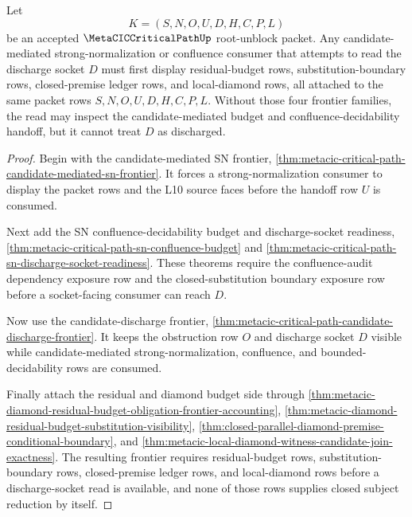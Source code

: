 \begin{theorem}
\label{thm:metacic-critical-path-residual-budget-discharge-frontier}
Let
$$
K=(S,N,O,U,D,H,C,P,L)
$$
be an accepted $\MetaCICCriticalPathUp$ root-unblock packet. Any candidate-mediated strong-normalization or confluence consumer that attempts to read the discharge socket $D$ must first display residual-budget rows, substitution-boundary rows, closed-premise ledger rows, and local-diamond rows, all attached to the same packet rows $S,N,O,U,D,H,C,P,L$. Without those four frontier families, the read may inspect the candidate-mediated budget and confluence-decidability handoff, but it cannot treat $D$ as discharged.
\end{theorem}
\begin{proof}
Begin with the candidate-mediated SN frontier, \autoref{thm:metacic-critical-path-candidate-mediated-sn-frontier}. It forces a strong-normalization consumer to display the packet rows and the L10 source faces before the handoff row $U$ is consumed.

Next add the SN confluence-decidability budget and discharge-socket readiness, \autoref{thm:metacic-critical-path-sn-confluence-budget} and \autoref{thm:metacic-critical-path-sn-discharge-socket-readiness}. These theorems require the confluence-audit dependency exposure row and the closed-substitution boundary exposure row before a socket-facing consumer can reach $D$.

Now use the candidate-discharge frontier, \autoref{thm:metacic-critical-path-candidate-discharge-frontier}. It keeps the obstruction row $O$ and discharge socket $D$ visible while candidate-mediated strong-normalization, confluence, and bounded-decidability rows are consumed.

Finally attach the residual and diamond budget side through \autoref{thm:metacic-diamond-residual-budget-obligation-frontier-accounting}, \autoref{thm:metacic-diamond-residual-budget-substitution-visibility}, \autoref{thm:closed-parallel-diamond-premise-conditional-boundary}, and \autoref{thm:metacic-local-diamond-witness-candidate-join-exactness}. The resulting frontier requires residual-budget rows, substitution-boundary rows, closed-premise ledger rows, and local-diamond rows before a discharge-socket read is available, and none of those rows supplies closed subject reduction by itself.
\end{proof}

